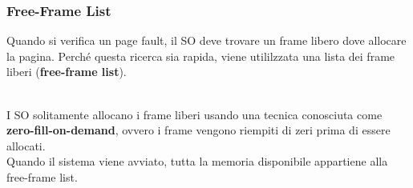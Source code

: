 \documentclass{article}
\begin{document}
			\subsubsection{Free-Frame List}
				Quando si verifica un page fault, il SO deve trovare un frame libero dove allocare la pagina. Perché questa ricerca sia rapida, viene utililzzata una lista dei frame liberi (\textbf{free-frame list}).
				\begin{figure}[ht!]
				\end{figure}
				\\I SO solitamente allocano i frame liberi usando una tecnica conosciuta come \textbf{zero-fill-on-demand}, ovvero i frame vengono riempiti di zeri prima di essere allocati.
				\\Quando il sistema viene avviato, tutta la memoria disponibile appartiene alla free-frame list.
\end{document}
